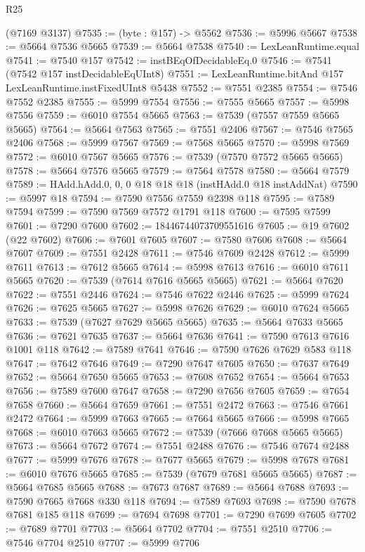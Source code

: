 \begin{lexlean}{R25}
\begin{coremodule}
    (@7169 @3137)
@7535 := (byte : @157) -> @5562
@7536 := @5996 @5667
@7538 := @5664 @7536 @5665
@7539 := @5664 @7538
@7540 := LexLeanRuntime.equal
@7541 := @7540 @157
@7542 := instBEqOfDecidableEq.{0}
@7546 := @7541 (@7542 @157 instDecidableEqUInt8)
@7551 := LexLeanRuntime.bitAnd @157 LexLeanRuntime.instFixedUInt8 @5438
@7552 := @7551 @2385
@7554 := @7546 @7552 @2385
@7555 := @5999 @7554
@7556 := @7555 @5665
@7557 := @5998 @7556
@7559 := @6010 @7554 @5665
@7563 := @7539 (@7557 @7559 @5665 @5665)
@7564 := @5664 @7563
@7565 := @7551 @2406
@7567 := @7546 @7565 @2406
@7568 := @5999 @7567
@7569 := @7568 @5665
@7570 := @5998 @7569
@7572 := @6010 @7567 @5665
@7576 := @7539 (@7570 @7572 @5665 @5665)
@7578 := @5664 @7576 @5665
@7579 := @7564 @7578
@7580 := @5664 @7579
@7589 := HAdd.hAdd.{0, 0, 0} @18 @18 @18 (instHAdd.{0} @18 instAddNat)
@7590 := @5997 @18
@7594 := @7590 @7556 @7559 @2398 @118
@7595 := @7589 @7594
@7599 := @7590 @7569 @7572 @1791 @118
@7600 := @7595 @7599
@7601 := @7290 @7600
@7602 := 18446744073709551616
@7605 := @19 @7602 (@22 @7602)
@7606 := @7601 @7605
@7607 := @7580 @7606
@7608 := @5664 @7607
@7609 := @7551 @2428
@7611 := @7546 @7609 @2428
@7612 := @5999 @7611
@7613 := @7612 @5665
@7614 := @5998 @7613
@7616 := @6010 @7611 @5665
@7620 := @7539 (@7614 @7616 @5665 @5665)
@7621 := @5664 @7620
@7622 := @7551 @2446
@7624 := @7546 @7622 @2446
@7625 := @5999 @7624
@7626 := @7625 @5665
@7627 := @5998 @7626
@7629 := @6010 @7624 @5665
@7633 := @7539 (@7627 @7629 @5665 @5665)
@7635 := @5664 @7633 @5665
@7636 := @7621 @7635
@7637 := @5664 @7636
@7641 := @7590 @7613 @7616 @1001 @118
@7642 := @7589 @7641
@7646 := @7590 @7626 @7629 @583 @118
@7647 := @7642 @7646
@7649 := @7290 @7647 @7605
@7650 := @7637 @7649
@7652 := @5664 @7650 @5665
@7653 := @7608 @7652
@7654 := @5664 @7653
@7656 := @7589 @7600 @7647
@7658 := @7290 @7656 @7605
@7659 := @7654 @7658
@7660 := @5664 @7659
@7661 := @7551 @2472
@7663 := @7546 @7661 @2472
@7664 := @5999 @7663
@7665 := @7664 @5665
@7666 := @5998 @7665
@7668 := @6010 @7663 @5665
@7672 := @7539 (@7666 @7668 @5665 @5665)
@7673 := @5664 @7672
@7674 := @7551 @2488
@7676 := @7546 @7674 @2488
@7677 := @5999 @7676
@7678 := @7677 @5665
@7679 := @5998 @7678
@7681 := @6010 @7676 @5665
@7685 := @7539 (@7679 @7681 @5665 @5665)
@7687 := @5664 @7685 @5665
@7688 := @7673 @7687
@7689 := @5664 @7688
@7693 := @7590 @7665 @7668 @330 @118
@7694 := @7589 @7693
@7698 := @7590 @7678 @7681 @185 @118
@7699 := @7694 @7698
@7701 := @7290 @7699 @7605
@7702 := @7689 @7701
@7703 := @5664 @7702
@7704 := @7551 @2510
@7706 := @7546 @7704 @2510
@7707 := @5999 @7706

\end{coremodule}
\end{lexlean}
